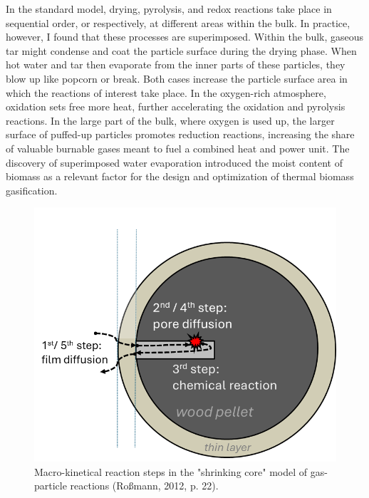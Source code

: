 \documentclass[authordate, anecdote]{jote-new-article}
\begin{document}
	In the standard model, drying, pyrolysis, and redox reactions take place in sequential order, or respectively, at different areas within the bulk. In practice, however, I found that these processes are superimposed. Within the bulk, gaseous tar might condense and coat the particle surface during the drying phase. When hot water and tar then evaporate from the inner parts of these particles, they blow up like popcorn or break. Both cases increase the particle surface area in which the reactions of interest take place. In the oxygen-rich atmosphere, oxidation sets free more heat, further accelerating the oxidation and pyrolysis reactions. In the large part of the bulk, where oxygen is used up, the larger surface of puffed-up particles promotes reduction reactions, increasing the share of valuable burnable gases meant to fuel a combined heat and power unit. The discovery of superimposed water evaporation introduced the moist content of biomass as a relevant factor for the design and optimization of thermal biomass gasification.



	\begin{figure}
		\includegraphics[width=\linewidth]{media/image2.png}

		\caption{Macro-kinetical reaction steps in the "shrinking core" model of gas-particle reactions (Roßmann, 2012, p. 22).}

		\label{fig:rId8}


	\end{figure}
\end{document}
